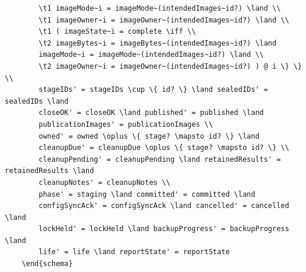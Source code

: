 \documentclass{article}
\begin{document}
\begin{verbatim}
		\t1 imageMode~i = imageMode~(intendedImages~id?) \land \\
		\t1 imageOwner~i = imageOwner~(intendedImages~id?) \land \\
		\t1 ( imageState~i = complete \iff \\
		\t2 imageBytes~i = imageBytes~(intendedImages~id?) \land
		imageMode~i = imageMode~(intendedImages~id?) \land \\
		\t2 imageOwner~i = imageOwner~(intendedImages~id?) ) @ i \} \} \\
		stageIDs' = stageIDs \cup \{ id? \} \land sealedIDs' = sealedIDs \land
		closeOK' = closeOK \land published' = published \land
		publicationImages' = publicationImages \\
		owned' = owned \oplus \{ stage? \mapsto id? \} \land
		cleanupDue' = cleanupDue \oplus \{ stage? \mapsto id? \} \\
		cleanupPending' = cleanupPending \land retainedResults' = retainedResults \land
		cleanupNotes' = cleanupNotes \\
		phase' = staging \land committed' = committed \land
		configSyncAck' = configSyncAck \land cancelled' = cancelled \land
		lockHeld' = lockHeld \land backupProgress' = backupProgress \land
		life' = life \land reportState' = reportState
	\end{schema}


\end{verbatim}
\end{document}
